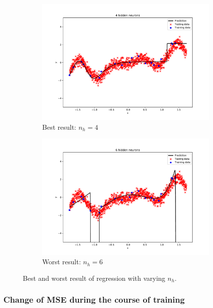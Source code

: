 \documentclass{article}
\begin{document}
\begin{figure}[!ht]
\centering
\begin{subfigure}{0.8\textwidth}
\includegraphics[width=\textwidth]{./Figures/1_1_c_nh_besttest.pdf}
\caption{Best result: $n_h=4$}
\label{1_1_c_best}
\end{subfigure}

\begin{subfigure}{0.8\textwidth}
\includegraphics[width=\textwidth]{./Figures/1_1_c_nh_worsttest.pdf}
\caption{Worst result: $n_h=6$}
\label{1_1_c_worst}
\end{subfigure}

\caption{Best and worst result of regression with varying $n_h$.}
\label{1_1_c_bestworst}
\end{figure}

\subsubsection{Change of MSE during the course of training}
\end{document}
